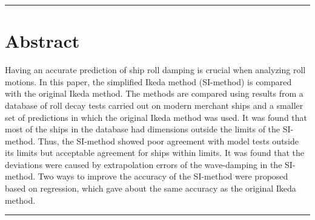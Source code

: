 {\footnotesize
\noindent\rule{\columnwidth}{0.4pt}
\section*{Abstract}\label{se:abstract}
Having an accurate prediction of ship roll damping is crucial when analyzing roll motions. In this paper, the simplified Ikeda method (SI-method) is compared with the original Ikeda method. The methods are compared using results from a database of roll decay tests carried out on modern merchant ships and a smaller set of predictions in which the original Ikeda method was used. It was found that most of the ships in the database had dimensions outside the limits of the SI-method. Thus, the SI-method showed poor agreement with model tests outside its limits but acceptable agreement for ships within limits. It was found that the deviations were caused by extrapolation errors of the wave-damping in the SI-method. Two ways to improve the accuracy of the SI-method were proposed based on regression, which gave about the same accuracy as the original Ikeda method.

}
\newline
\noindent\rule{\columnwidth}{0.4pt}
